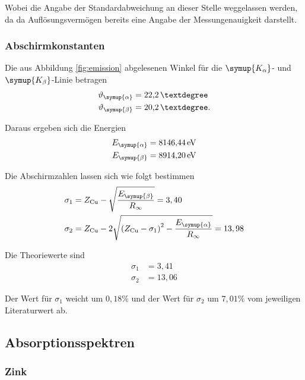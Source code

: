 Wobei die Angabe der Standardabweichung an dieser Stelle weggelassen werden, da da Auflösungsvermögen bereits eine
Angabe der Messungenauigkeit darstellt.

\subsubsection{Abschirmkonstanten}
Die aus Abbildung \ref{fig:emission} abgelesenen Winkel für die  $\symup{K_\alpha}$- und $\symup{K_\beta}$-Linie betragen
\begin{align*}
  \vartheta_{\symup{\alpha}} &= \SI{22,2}{°} \\
  \vartheta_{\symup{\beta}} &= \SI{20,2}{°}.
\end{align*}

Daraus ergeben sich die Energien
\begin{align*}
  E_{\symup{\alpha}} &= \SI{8146,44}{\eV} \\
  E_{\symup{\beta}} &= \SI{8914,20}{\eV}
\end{align*}

Die Abschirmzahlen lassen sich wie folgt bestimmen
\begin{align}
  \sigma_1 &= Z_\text{Cu} - \sqrt{\frac{E_{\symup{\beta}}}{R_\infty}} = 3,40 \\
  \sigma_2 &= Z_\text{Cu} - 2 \sqrt{\left(Z_\text{Cu} - \sigma_1 \right)^2 - \frac{E_{\symup{\alpha}}}{R_\infty}} = 13,98
\end{align}

Die Theoriewerte sind
\begin{align*}
  \sigma_1 &= 3,41 \\
  \sigma_2 &= 13,06
\end{align*}

Der Wert für $\sigma_1$ weicht um $0,18 \%$ und der Wert für $\sigma_2$ um $7,01 \%$ vom jeweiligen Literaturwert ab.

\subsection{Absorptionsspektren}

\subsubsection{Zink \label{sec:zink}}

